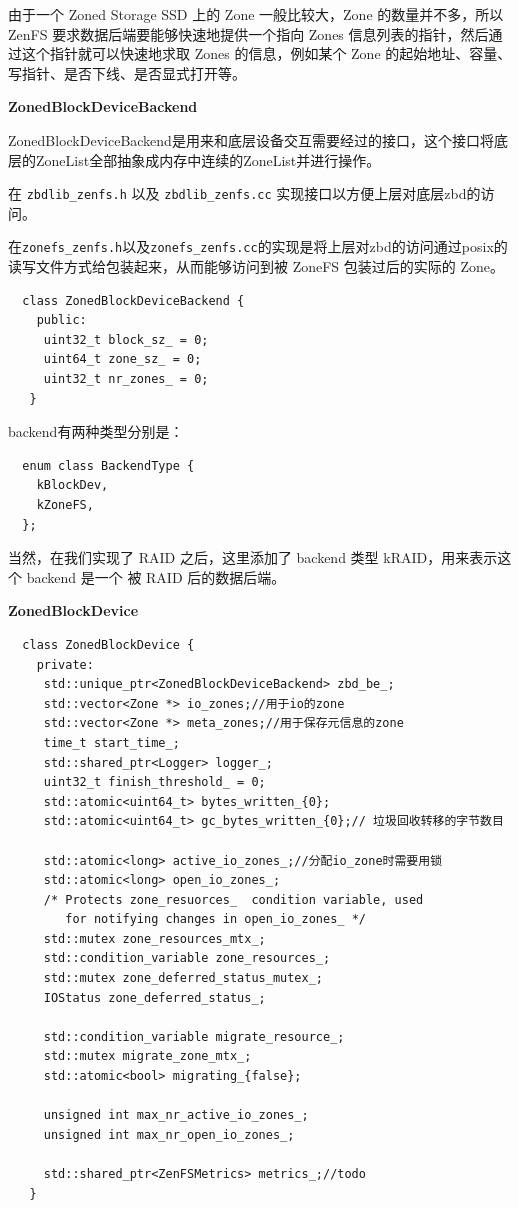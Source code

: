 由于一个 Zoned Storage SSD 上的 Zone 一般比较大，Zone 的数量并不多，所以 ZenFS 要求数据后端要能够快速地提供一个指向 Zones 信息列表的指针，然后通过这个指针就可以快速地求取 Zones 的信息，例如某个 Zone 的起始地址、容量、写指针、是否下线、是否显式打开等。

\textbf{ZonedBlockDeviceBackend}

ZonedBlockDeviceBackend是用来和底层设备交互需要经过的接口，这个接口将底层的ZoneList全部抽象成内存中连续的ZoneList并进行操作。

在 \verb|zbdlib_zenfs.h| 以及 \verb|zbdlib_zenfs.cc| 实现接口以方便上层对底层zbd的访问。

在\verb|zonefs_zenfs.h|以及\verb|zonefs_zenfs.cc|的实现是将上层对zbd的访问通过posix的读写文件方式给包装起来，从而能够访问到被 ZoneFS 包装过后的实际的 Zone。

\begin{lstlisting}
  class ZonedBlockDeviceBackend {
    public:
     uint32_t block_sz_ = 0;
     uint64_t zone_sz_ = 0;
     uint32_t nr_zones_ = 0;
   }   
\end{lstlisting}

backend有两种类型分别是：

\begin{lstlisting}
  enum class BackendType {
    kBlockDev,
    kZoneFS,
  };
\end{lstlisting}

当然，在我们实现了 RAID 之后，这里添加了 backend 类型 kRAID，用来表示这个 backend 是一个 被 RAID 后的数据后端。

\textbf{ZonedBlockDevice}

\begin{lstlisting}
  class ZonedBlockDevice {
    private:
     std::unique_ptr<ZonedBlockDeviceBackend> zbd_be_;
     std::vector<Zone *> io_zones;//用于io的zone
     std::vector<Zone *> meta_zones;//用于保存元信息的zone
     time_t start_time_;
     std::shared_ptr<Logger> logger_;
     uint32_t finish_threshold_ = 0;
     std::atomic<uint64_t> bytes_written_{0};
     std::atomic<uint64_t> gc_bytes_written_{0};// 垃圾回收转移的字节数目
   
     std::atomic<long> active_io_zones_;//分配io_zone时需要用锁
     std::atomic<long> open_io_zones_;
     /* Protects zone_resuorces_  condition variable, used
        for notifying changes in open_io_zones_ */
     std::mutex zone_resources_mtx_;
     std::condition_variable zone_resources_;
     std::mutex zone_deferred_status_mutex_;
     IOStatus zone_deferred_status_;
   
     std::condition_variable migrate_resource_;
     std::mutex migrate_zone_mtx_;
     std::atomic<bool> migrating_{false};
   
     unsigned int max_nr_active_io_zones_;
     unsigned int max_nr_open_io_zones_;
   
     std::shared_ptr<ZenFSMetrics> metrics_;//todo
   }   
\end{lstlisting}

